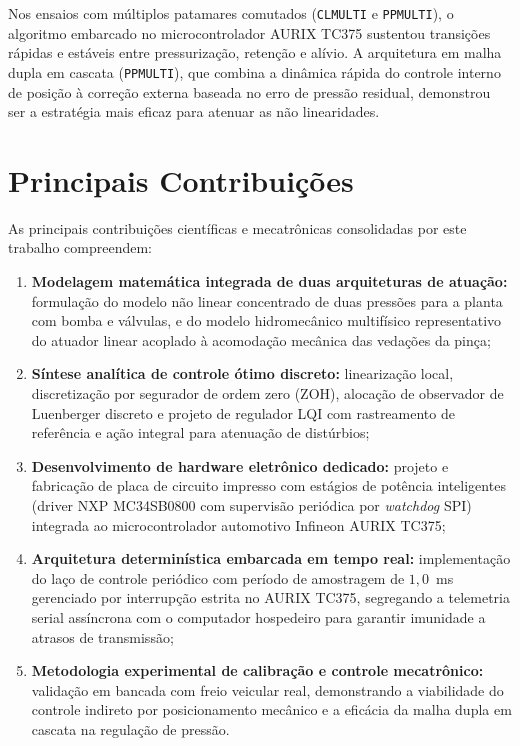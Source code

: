 Nos ensaios com múltiplos patamares comutados (\texttt{CLMULTI} e \texttt{PPMULTI}), o algoritmo embarcado no microcontrolador AURIX TC375 sustentou transições rápidas e estáveis entre pressurização, retenção e alívio. A arquitetura em malha dupla em cascata (\texttt{PPMULTI}), que combina a dinâmica rápida do controle interno de posição à correção externa baseada no erro de pressão residual, demonstrou ser a estratégia mais eficaz para atenuar as não linearidades.

\section[Principais Contribuições]{Principais Contribuições}
\label{sec:conclusao-contribuicoes}

As principais contribuições científicas e mecatrônicas consolidadas por este trabalho compreendem:
\begin{enumerate}
    \item \textbf{Modelagem matemática integrada de duas arquiteturas de atuação:} formulação do modelo não linear concentrado de duas pressões para a planta com bomba e válvulas, e do modelo hidromecânico multifísico representativo do atuador linear acoplado à acomodação mecânica das vedações da pinça;
    \item \textbf{Síntese analítica de controle ótimo discreto:} linearização local, discretização por segurador de ordem zero (ZOH), alocação de observador de Luenberger discreto e projeto de regulador LQI com rastreamento de referência e ação integral para atenuação de distúrbios;
    \item \textbf{Desenvolvimento de hardware eletrônico dedicado:} projeto e fabricação de placa de circuito impresso com estágios de potência inteligentes (driver NXP MC34SB0800 com supervisão periódica por \textit{watchdog} SPI) integrada ao microcontrolador automotivo Infineon AURIX TC375;
    \item \textbf{Arquitetura determinística embarcada em tempo real:} implementação do laço de controle periódico com período de amostragem de $1{,}0$~ms gerenciado por interrupção estrita no AURIX TC375, segregando a telemetria serial assíncrona com o computador hospedeiro para garantir imunidade a atrasos de transmissão;
    \item \textbf{Metodologia experimental de calibração e controle mecatrônico:} validação em bancada com freio veicular real, demonstrando a viabilidade do controle indireto por posicionamento mecânico e a eficácia da malha dupla em cascata na regulação de pressão.
\end{enumerate}

